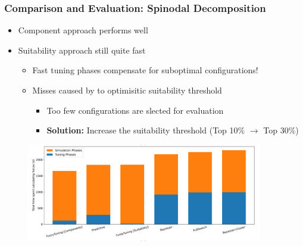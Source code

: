 \documentclass[
	10pt,
	t		%
]{beamer}
\begin{document}
\begin{frame}
	\frametitle{Comparison and Evaluation: Spinodal Decomposition}

	\begin{itemize}
		\item Component approach performs well
		\item Suitability approach still quite fast
		      \begin{itemize}
			      \item Fast tuning phases compensate for suboptimal configurations!
			      \item Misses caused by to optimisitic suitability threshold

			            \begin{itemize}
				            \item  Too few configurations are slected for evaluation
				            \item \textbf{Solution:} Increase the suitability threshold (Top 10\% $\rightarrow$ Top 30\%)
			            \end{itemize}
		      \end{itemize}

	\end{itemize}

	\begin{figure}
		\centering
		\includegraphics[width=0.92\textwidth]{figures/spinodal-total.png}
	\end{figure}
\end{frame}
\end{document}
